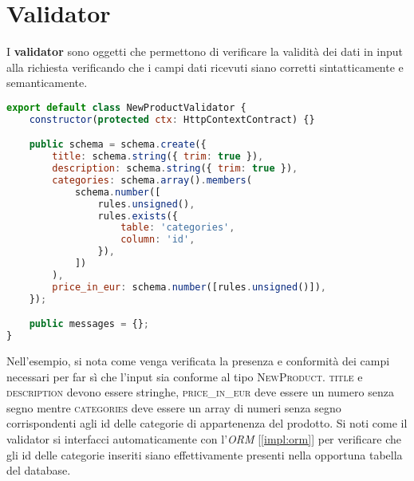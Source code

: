 \section{Validator}
\label{impl:validator}
I \textbf{validator} sono oggetti che permettono di verificare la validità dei dati in input alla richiesta verificando che i campi dati ricevuti siano corretti sintatticamente e semanticamente.

\begin{lstlisting}[language=JavaScript]
export default class NewProductValidator {
    constructor(protected ctx: HttpContextContract) {}

    public schema = schema.create({
        title: schema.string({ trim: true }),
        description: schema.string({ trim: true }),
        categories: schema.array().members(
            schema.number([
                rules.unsigned(),
                rules.exists({
                    table: 'categories',
                    column: 'id',
                }),
            ])
        ),
        price_in_eur: schema.number([rules.unsigned()]),
    });

    public messages = {};
}
\end{lstlisting}

Nell'esempio, si nota come venga verificata la presenza e conformità dei campi necessari per far sì che l'input sia conforme al tipo \textsc{NewProduct}. \textsc{title} e \textsc{description} devono essere stringhe, \textsc{price\_in\_eur} deve essere un numero senza segno mentre \textsc{categories} deve essere un array di numeri senza segno corrispondenti agli id delle categorie di appartenenza del prodotto. Si noti come il validator si interfacci automaticamente con l'\textit{ORM} [\autoref{impl:orm}] per verificare che gli id delle categorie inseriti siano effettivamente presenti nella opportuna tabella del database.

